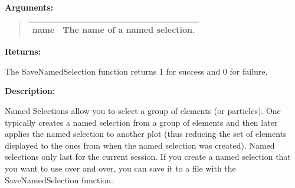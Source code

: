 \documentclass[letterpaper,10pt,english]{sphinxmanual}
\begin{document}
\begin{DUlineblock}{0em}
\item[] 
\item[] \textbf{Arguments:}
\end{DUlineblock}
\begin{quote}

\begin{tabulary}{\linewidth}{|L|L|}
\hline

name
 & 
The name of a named selection.
\\
\hline\end{tabulary}

\end{quote}

\begin{DUlineblock}{0em}
\item[] 
\item[] \textbf{Returns:}
\item[] The SaveNamedSelection function returns 1 for success and 0 for failure.
\item[] 
\item[] \textbf{Description:}
\item[] Named Selections allow you to select a group of elements (or particles).
One typically creates a named selection from a group of elements and then
later applies the named selection to another plot (thus reducing the
set of elements displayed to the ones from when the named selection was
created).  Named selections only last for the current session.  If you
create a named selection that you want to use over and over, you can save
it to a file with the SaveNamedSelection function.
\end{DUlineblock}

\begin{DUlineblock}{0em}
\item[] 
\end{DUlineblock}
\end{document}

